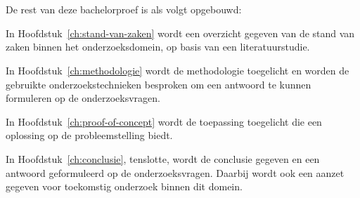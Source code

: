\section{}%
\label{sec:opzet-bachelorproef}


De rest van deze bachelorproef is als volgt opgebouwd:

In Hoofdstuk~\ref{ch:stand-van-zaken} wordt een overzicht gegeven van de stand van zaken binnen het onderzoeksdomein, op basis van een literatuurstudie.

In Hoofdstuk~\ref{ch:methodologie} wordt de methodologie toegelicht en worden de gebruikte onderzoekstechnieken besproken om een antwoord te kunnen formuleren op de onderzoeksvragen.

In Hoofdstuk~\ref{ch:proof-of-concept} wordt de toepassing toegelicht die een oplossing op de probleemstelling biedt.

In Hoofdstuk~\ref{ch:conclusie}, tenslotte, wordt de conclusie gegeven en een antwoord geformuleerd op de onderzoeksvragen. Daarbij wordt ook een aanzet gegeven voor toekomstig onderzoek binnen dit domein.